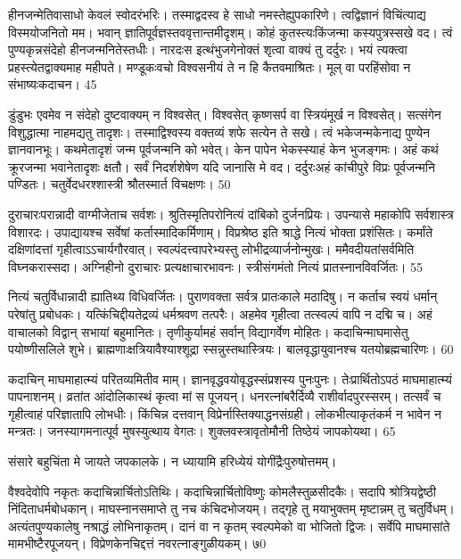हीनजन्मेतिवासाधो केवलं स्वोदरंभरिः।
तस्माद्वदस्व हे साधो नमस्तेह्युपकारिणे।
त्वद्विज्ञानं विचिंत्याद्य विस्मयोजनितो मम।
भवान् ज्ञातिपूर्वज्ञस्तववृत्तान्तमीदृशम्।
कोहं कुतस्त्यःकिंजन्मा कस्यपुत्रस्सखे वद।
त्वं पुण्यकृन्नसंदेहो हीनजन्मनितेस्तधीः।
नारदःस इत्थंभुजगेनोक्तं शृत्वा वाक्यं तु दर्दुरः।
भयं त्यक्त्वा प्रहस्त्येतद्वाक्यमाह महीपते।
मण्डूकःवचो विश्वसनीयं ते न हि कैतवमाश्रितः।
मूल् वा परहिंसोवा न संभाष्यःकदाचन।
45

डुंडुभः
एवमेव न संदेहो दुष्टवाक्यम् न विश्वसेत्।
विश्वसेत् कृष्णसर्प वा स्त्रियंमूर्ख न विश्वसेत्।
सत्संगेन विशुद्धात्मा नाहमद्यतु तादृशः।
तस्माद्विश्वस्य वक्तव्यं शफे सत्येन ते सखे।
त्वं भकेजन्मकेनाद्य पुण्येन ज्ञानवानभूः।
कथमेतादृशं जन्म पूर्वजन्मनि को भवेत्।
केन पापेन भेकस्स्याहं केन भुजङ्गमः।
अहं कथं क्रूरजन्मा भवानेतादृशः क्षतौ।
सर्वं निदर्शशेषेण यदि जानासि मे वद।
दर्दुरःअहं कांचीपुरे विप्रः पूर्वजन्मनि पण्डितः।
चतुर्वेदधरश्शास्त्री श्रौतस्मार्त विचक्षणः।
50

दुराचारःपरान्नादी वाग्मीजेताच सर्वशः।
श्रुतिस्मृतिपरोनित्यं दांबिको दुर्जनप्रियः।
उपन्यासे महाकोपि सर्वशास्त्र विशारदः।
उपाद्यायश्च सर्वेषां कर्तास्मादिकर्मिणाम्।
विप्रश्रेष्ठ इति श्राद्धे नित्यं भोक्ता प्रशंसितः।
कर्मांते दक्षिणांदत्तां गृहीत्वाऽऽचार्यगौरवात्।
स्वल्पंदत्त्वापरेभ्यस्तु लोभीद्रव्यार्जनोन्मुखः।
ममैवदीयतांसर्वमिति विघ्नकरास्सदा।
अग्निहीनो दुराचारः प्रत्यक्षाचारभावनः।
स्त्रीसंगमंतो नित्यं प्रातस्नानविवर्जितः।
55


नित्यं चतुर्विधान्नादी ह्यातिथ्य विधिवर्जितः।
पुराणवक्ता सर्वत्र प्रातःकाले मठादिषु।
न कर्ताच स्वयं धर्मान् परेषांतु प्रबोधकः।
यत्किंचिद्दीयतेद्रव्यं धर्मश्रवण तत्परैः।
अहमेव गृहीत्वा तत्स्वल्पं वापि न दद्मि च।
अहं वाचालको विद्वान् सभायां बहुमानितः।
तृणीकुर्यामहं सर्वान् विद्यागर्वेण मोहितः।
कदाचिन्माघमासेतु पयोष्णीसलिले शुभे।
ब्राह्मणाःक्षत्रियावैश्याश्शूद्रा स्सन्नुस्तथास्त्रियः।
बालवृद्धायुवानश्च यतयोब्रह्मचारिणः।
60

कदाचिन् माघमाहात्म्यं परितव्यमितीव माम्।
ज्ञानवृद्धवयोवृद्धस्संप्रशस्य पुनःपुनः।
तेःप्रार्थितोऽपठं माघमाहात्म्यं पापनाशनम्।
व्रतांत आंदोलिकास्थं कृत्वा मां स पूजयन्।
धनरत्नांबरैर्दिव्यै राशीर्वादपुरस्सरम्।
तत्सर्वं च गृहीत्वाहं परिज्ञातापि लोभधीः।
किंचिन्न दत्तवान् विप्रेर्नास्तिक्याद्धनसंग्रही।
लोकभीत्याकृतंकर्म न भावेन न मन्त्रतः।
जनस्यागमनात्पूर्व मुषस्युत्थाय वेगतः।
शुक्लवस्त्रावृतोमौनी तिष्ठेयं जापकोयथा।
65

संसारे बहुचिंता मे जायते जपकालके।
न ध्यायामि हरिध्येयं योगींद्रैःपुरुषोत्तमम्।

वैश्वदेवोपि नकृतः कदाचिन्नार्चितोऽतिथिः।
कदाचिन्नार्चितोविष्णुः कोमलैस्तुळसीदकैः।
सदापि श्रोत्रियद्वेष्ठी निंदिताधर्मबोधकान्।
माघस्नानसमाप्ते तु नच कंचिदभोजयम्।
तद्गृहे तु मयाभुक्तम् मृष्टान्नम् तु चतुर्विधम्।
अत्यंतपुण्यकालेषु नश्राद्धं लोभिनाकृतम्।
दानं वा न कृतम् स्वल्पमेको वा भोजितो द्विजः।
सर्वेपि माघमासांते मामभीष्टैरपूजयन्।
विप्रेणकेनचिद्दत्तं नवरत्नाङ्गुळीयकम्।
७0

